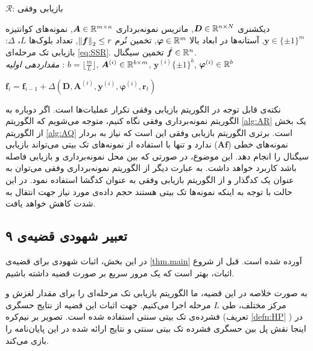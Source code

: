 \begin{algorithm}
	\caption{$ \mathcal{R} $: بازیابی وفقی}
	\label{alg:AR}
	\begin{algorithmic}[1]
		\renewcommand{\algorithmicrequire}{\textbf{ورودی:}}
		\renewcommand{\algorithmicensure}{\textbf{خروجی:}}
		\REQUIRE دیکشنری $ \bm{D}\in\mathbb{R}^{n\times N} $, ماتریس نمونه‌برداری $ \bm{A}\in\mathbb{R}^{m\times n} $, نمونه‌های کوانتیزه $ \bm{y} \in \lbrace\pm 1\rbrace^{m} $, آستانه‌ها در ابعاد بالا $ \bm{\varphi}\in\mathbb{R}^{m} $, تخمین نُرم $ \left\lVert\bm{f}\right\rVert_{2}\leq r $, تعداد بلوک‌ها $ L $، $\varDelta$: بازیابی تک مرحله‌ای \eqref{eq:SSR}.
		\ENSURE  تخمین سیگنال $ \hat{\bm{f}}\in \mathbb{R}^{n} $.
		\\ \textit{مقداردهی اولیه} :  $ b = \lfloor\frac{m}{L}\rfloor $, $ \bm{A}^{(i)}\in \mathbb{R}^{b\times m}$, $ \bm{y}^{\left(i\right)} \lbrace\pm 1\rbrace^{b}$, $\bm{\varphi}^{\left(i\right)}\in \mathbb{R}^{b} $
		\begin{latin}
		\STATE $ \bm{f}_{i} =\bm{f}_{i-1}+ \varDelta\left(\bm{D},\bm{A}^{(i)},\bm{y}^{\left(i\right)},\bm{\varphi}^{\left(i\right)},\bm{r}_{t}\right) $ 
		\ENDFOR
		\end{latin}
	\end{algorithmic} 
\end{algorithm}


نکته‌ی قابل توجه در الگوریتم بازیابی وفقی تکرار عملیات‌ها است. اگر دوباره به الگوریتم نمونه‌برداری وفقی نگاه کنیم، متوجه می‌شویم که الگوریتم 
\ref{alg:AR}
یک بخش از الگوریتم 
\ref{alg:AQ}
است. برتری الگوریتم بازیابی وفقی این است که نیاز به بردار نمونه‌های خطی
($\bm{A}\bm{f}$)
 ندارد و تنها با استفاده از نمونه‌های تک بیتی می‌تواند بازیابی سیگنال را انجام دهد. این موضوع، در صورتی که بین محل نمونه‌برداری و بازیابی فاصله باشد کاربرد خواهد داشت. به عبارت دیگر از الگوریتم نمونه‌برداری وفقی می‌توان به عنوان یک کدگذار
  و از الگوریتم بازیابی وفقی به عنوان کدگشا
 استفاده نمود. در این حالت با توجه به اینکه نمونه‌ها تک بیتی هستند حجم داده‌ی مورد نیاز جهت انتقال به شدت کاهش خواهد یافت.

\subsection{تعبیر شهودی قضیه‌ی ۹}
\label{proof:IntuitiveMain}
در این بخش، اثبات شهودی برای قضیه‌ی
\ref{thm.main}
آورده شده است. قبل از شروع اثبات، بهتر است که یک مرور سریع بر صورت قضیه داشته باشیم.

به صورت خلاصه در این قضیه، ما الگوریتم بازیابی تک مرحله‌ای را برای مقدار لغزش و مرکز مختلف، طی 
$L$
مرحله اجرا می‌کنیم. جهت اثبات این قضیه از نتایج حسگری فشرده‌ی تک بیتی سنتی استفاده شده است. تصویر بر نیم‌کره (تعریف
\ref{defn:HP}
)
در اینجا نقش پل بین حسگری فشرده تک بیتی سنتی و نتایج ارائه شده در این پایان‌نامه را بازی می‌کند.


